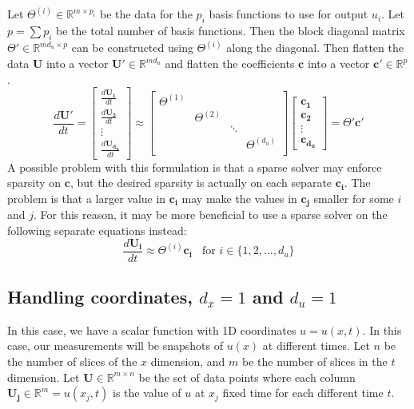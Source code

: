 \documentclass{article}
\let\vec\mathbf
\def\real{\mathbb{R}}
\begin{document}
Let $\Theta^{(i)} \in \real^{m \times p_i}$ be the data for the $p_i$ basis
functions to use for output $u_i$. Let $p = \sum p_i$ be the total number of
basis functions. Then the block diagonal matrix $\Theta' \in \real^{md_u \times p}$ can be constructed
using $\Theta^{(i)}$ along the diagonal. Then flatten the data $\vec{U}$ into a
vector $\vec{U'} \in \real^{md_u}$ and flatten the coefficients $\vec{c}$ into a
vector $\vec{c}' \in \real^{p}$.
\begin{equation}\label{eq:dx0-dudt-separate-theta}
\frac{d\vec{U'}}{dt} = 
\begin{bmatrix}
\frac{d\vec{U_1}}{dt} \\ \frac{d\vec{U_2}}{dt} \\ \vdots \\ \frac{d\vec{U_{d_u}}}{dt}
\end{bmatrix}
\approx
\begin{bmatrix}
\Theta^{(1)} \\
& \Theta^{(2)} \\
& & \ddots \\
& & & \Theta^{(d_u)} \\
\end{bmatrix}
\begin{bmatrix}
\vec{c_1} \\ \vec{c_2} \\ \vdots \\ \vec{c_{d_u}}
\end{bmatrix}
= \Theta' \vec{c}'
\end{equation}
A possible problem with this formulation is that a sparse solver may enforce
sparsity on $\vec{c}$, but the desired sparsity is actually on each separate
$\vec{c_i}$. The problem is that a larger value in $\vec{c_i}$ may make the
values in $\vec{c_j}$ smaller for some $i$ and $j$. For this reason, it may be
more beneficial to use a sparse solver on the following separate equations instead:
\begin{equation}\label{eq:diff-theta-eqs}
\frac{d\vec{U_i}}{dt} \approx \Theta^{(i)} \vec{c_i} \,\,\ \text{ for $i \in \{1,2,\hdots,d_u\} $}
\end{equation}

\subsection{Handling coordinates, $d_x = 1$ and $d_u = 1$}
In this case, we have a scalar function with 1D coordinates $u = u(x,t)$. In
this case, our measurements will be snapshots of $u(x)$ at different times. Let
$n$ be the number of slices of the $x$ dimension, and $m$ be the number of
slices in the $t$ dimension. Let $\vec{U} \in \real^{m \times n}$ be the set of
data points where each column $\vec{U_j} \in \real^m = u(x_j, t)$ is the value
of $u$ at $x_j$ fixed time for each different time $t$.
\end{document}
